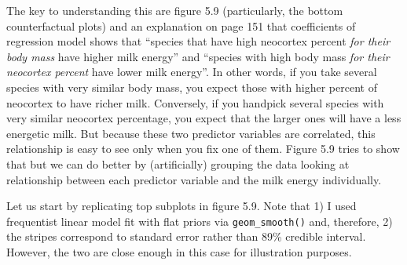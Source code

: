 \documentclass[
]{book}
\begin{document}
The key to understanding this are figure 5.9 (particularly, the bottom counterfactual plots) and an explanation on page 151 that coefficients of regression model shows that ``species that have high neocortex percent \emph{for their body mass} have higher milk energy'' and ``species with high body mass \emph{for their neocortex percent} have lower milk energy''. In other words, if you take several species with very similar body mass, you expect those with higher percent of neocortex to have richer milk. Conversely, if you handpick several species with very similar neocortex percentage, you expect that the larger ones will have a less energetic milk. But because these two predictor variables are correlated, this relationship is easy to see only when you fix one of them. Figure 5.9 tries to show that but we can do better by (artificially) grouping the data looking at relationship between each predictor variable and the milk energy individually.

Let us start by replicating top subplots in figure 5.9. Note that 1) I used frequentist linear model fit with flat priors via \texttt{geom\_smooth()} and, therefore, 2) the stripes correspond to standard error rather than 89\% credible interval. However, the two are close enough in this case for illustration purposes.
\end{document}
